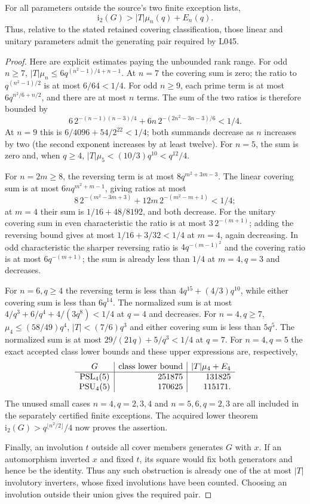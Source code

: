 \documentclass[10pt]{article}
\newcommand{\ii}{\mathrm i_2}\newcommand{\F}{\mathbb F}\newcommand{\GL}{\operatorname{GL}}\newcommand{\GU}{\operatorname{GU}}\newcommand{\Sp}{\operatorname{Sp}}\newcommand{\PGO}{\operatorname{PGO}}
\begin{document}
\begin{proposition}\label{arithmetic}
For all parameters outside the source's two finite exception lists,
\[
 \ii(G)>|T|\mu_n(q)+E_n(q).
\]
Thus, relative to the stated retained covering classification, those linear and
unitary parameters admit the generating pair required by L045.
\end{proposition}
\begin{proof}
Here are explicit estimates paying the unbounded rank range. For odd
$n\ge7$, $|T|\mu_n\le6q^{(n^2-1)/4+n-1}$. At $n=7$ the covering sum
is zero; the ratio to $q^{(n^2-1)/2}$ is at most $6/64<1/4$.
For odd $n\ge9$, each prime term is at most
$6q^{n^2/6+n/2}$, and there are at most $n$ terms. The sum of the two
ratios is therefore bounded by
\[
6\,2^{-(n-1)(n-3)/4}+6n\,2^{-(2n^2-3n-3)/6}<1/4.
\]
At $n=9$ this is $6/4096+54/2^{22}<1/4$; both summands decrease as
$n$ increases by two (the second exponent increases by at least twelve).
For $n=5$, the sum is zero and, when $q\ge4$,
$|T|\mu_5<(10/3)q^{10}<q^{12}/4$.

For $n=2m\ge8$, the reversing term is at most
$8q^{m^2+3m-3}$. The linear covering sum is at most
$6nq^{m^2+m-1}$, giving ratios at most
\[
8\,2^{-(m^2-3m+3)}+12m\,2^{-(m^2-m+1)}<1/4;
\]
at $m=4$ their sum is $1/16+48/8192$, and both decrease.
For the unitary covering sum in even characteristic the ratio is at most
$3\,2^{-(m+1)}$; adding the reversing bound gives at most
$1/16+3/32<1/4$ at $m=4$, again decreasing.
In odd characteristic the sharper reversing ratio is
$4q^{-(m-1)^2}$ and the covering ratio is at most $6q^{-(m+1)}$;
the sum is already less than $1/4$ at $m=4,q=3$ and decreases.

For $n=6,q\ge4$ the reversing term is less than
$4q^{15}+(4/3)q^{10}$, while either covering sum is less than $6q^{14}$.
The normalized sum is at most $4/q^3+6/q^4+4/(3q^8)<1/4$ at $q=4$
and decreases. For $n=4,q\ge7$, $\mu_4\le(58/49)q^4$,
$|T|<(7/6)q^3$ and either covering sum is less than $5q^5$.
The normalized sum is at most $29/(21q)+5/q^3<1/4$ at $q=7$.
For $n=4,q=5$ the exact accepted class lower bounds and these upper
expressions are, respectively,
\[
\begin{array}{c|r|r}
G&\text{class lower bound}&|T|\mu_4+E_4\\\hline
\operatorname{PSL}_4(5)&251875&131825\\
\operatorname{PSU}_4(5)&170625&115171.
\end{array}
\]
The unused small cases $n=4,q=2,3,4$ and $n=5,6,q=2,3$ are all included
in the separately certified finite exceptions. The acquired lower theorem
$\ii(G)>q^{\lfloor n^2/2\rfloor}/4$ now proves the assertion.

Finally, an involution $t$ outside all cover members generates $G$ with $x$.
If an automorphism inverted $x$ and fixed $t$, its square would fix both
generators and hence be the identity. Thus any such obstruction is already
one of the at most $|T|$ involutory inverters, whose fixed involutions have
been counted. Choosing an involution outside their union gives the required
pair.
\end{proof}
\end{document}
